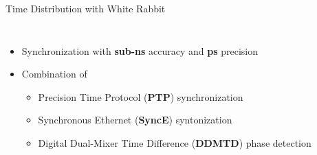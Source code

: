 \documentclass[compress,red]{beamer}
\begin{document}
\begin{frame}{Time Distribution with White Rabbit}


\begin{columns}[c]
  \begin{itemize}
    \item Synchronization with {\bf sub-ns} accuracy and {\bf ps} precision
    \item Combination of
	\begin{itemize}\small
	  \item Precision Time Protocol ({\bf PTP}) synchronization
	  \item Synchronous Ethernet ({\bf SyncE}) syntonization
	  \item Digital Dual-Mixer Time Difference ({\bf DDMTD}) phase detection
	\end{itemize}
  \end{itemize}
  \begin{center}
  \vspace{6.7cm}

  \end{center}  
\end{columns}

\end{frame}
\end{document}
